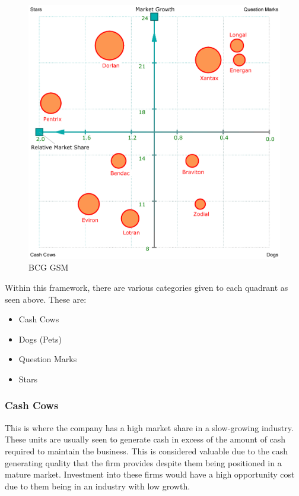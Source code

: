 \documentclass[a4paper]{article}
\begin{document}
{\begin{figure}[h]
	\centering
\includegraphics[scale=.17]{bcg-gsm}
	\caption{BCG GSM}
	\label{fig:bcg-gsm}
\end{figure}

\vspace{5pt}
\noindent Within this framework, there are various categories given to each quadrant as seen above. These are:
\begin{itemize}
	\item Cash Cows
	\item Dogs (Pets)
	\item Question Marks
	\item Stars
\end{itemize}

\subsubsection{Cash Cows}
This is where the company has a high market share in a slow-growing industry. These units are usually seen to generate cash in excess of the amount of cash required to maintain the business. This is considered valuable due to the cash generating quality that the firm provides despite them being positioned in a mature market. Investment into these firms would have a high opportunity cost due to them being in an industry with low growth.

}
\end{document}
